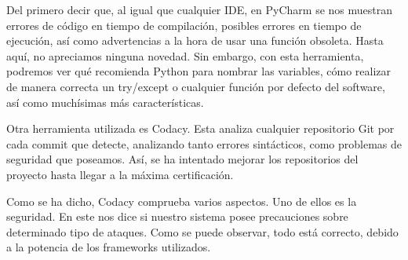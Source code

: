Del primero decir que, al igual que cualquier IDE, en PyCharm se nos muestran errores de código en tiempo de compilación, posibles errores en tiempo de ejecución, así como advertencias a la hora de usar una función obsoleta. Hasta aquí, no apreciamos ninguna novedad. Sin embargo, con esta herramienta, podremos ver qué recomienda Python para nombrar las variables, cómo realizar de manera correcta un try/except o cualquier función por defecto del software, así como muchísimas más características.

Otra herramienta utilizada es Codacy. Esta analiza cualquier repositorio Git por cada commit que detecte, analizando tanto errores sintácticos, como problemas de seguridad que poseamos. Así, se ha intentado mejorar los repositorios del proyecto hasta llegar a la máxima certificación.

Como se ha dicho, Codacy comprueba varios aspectos. Uno de ellos es la seguridad. En este nos dice si nuestro sistema posee precauciones sobre determinado tipo de ataques. Como se puede observar, todo está correcto, debido a la potencia de los frameworks utilizados.

